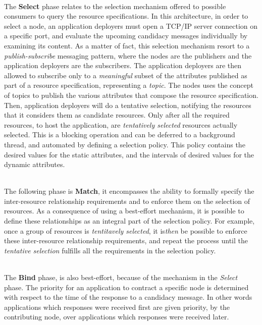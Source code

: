 \documentclass[12pt, titlepage]{uo_temp}
\begin{document}
     \\ The \textbf{Select} phase relates to the selection mechanism offered to possible
     consumers to query the resource specifications. In this architecture, in order to
     select a node, an application deployers must open a TCP/IP server connection on a
     specific port, and evaluate the upcoming candidacy messages individually by examining
     its content. As a matter of fact, this selection mechanism resort to a
     \emph{publish-subscribe} messaging pattern, where the nodes are the publishers and
     the application deployers are the subscribers. The application deployers are then
     allowed to subscribe only to a \emph{meaningful} subset of the attributes published
     as part of a resource specification, representing a \emph{topic}. The nodes uses the
     concept of topics to publish the various attributes that compose the resource
     specification. Then, application deployers will do a tentative selection, notifying
     the resources that it considers them as candidate resources. Only after all the
     required resources, to host the application, are \emph{tentatively selected}
     resources actually selected. This is a blocking operation and can be deferred to a
     background thread, and automated by defining a selection policy. This policy contains
     the desired values for the static attributes, and the intervals of desired values for
     the dynamic attributes.

     \\ The following phase is \textbf{Match}, it encompasses the ability to formally
     specify the inter-resource relationship requirements and to enforce them on the
     selection of resources. As a consequence of using a best-effort mechanism, it is
     possible to define these relationships as an integral part of the selection
     policy. For example, once a group of resources is \emph{tentitavely selected}, it
     is\emph{then} be possible to enforce these inter-resource relationship requirements,
     and repeat the process until the \emph{tentative selection} fulfills all the
     requirements in the selection policy.
    
     \\ The \textbf{Bind} phase, is also best-effort, because of the mechanism in the
     \emph{Select} phase. The priority for an application to contract a specific node is
     determined with respect to the time of the response to a candidacy message. In other
     words applications which responses were received first are given priority, by the
     contributing node, over applications which responses were received later.
\end{document}
